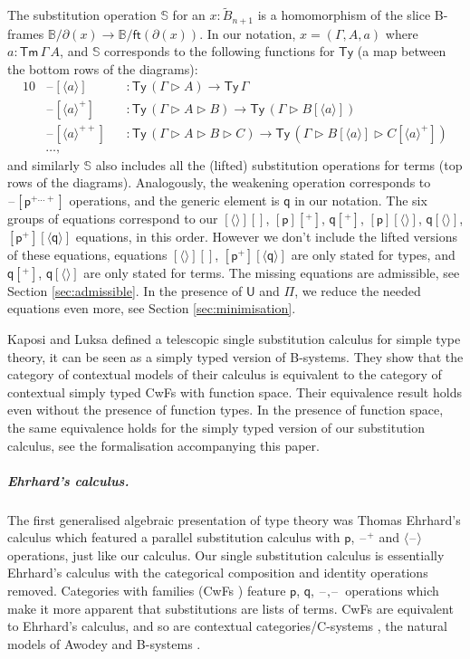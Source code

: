 \documentclass[a4paper,UKenglish,cleveref, autoref, thm-restate]{lipics-v2021}
\newcommand{\ra}{\rightarrow}
\newcommand{\Ty}{\mathsf{Ty}}
\newcommand{\Tm}{\mathsf{Tm}}
\newcommand{\p}{\mathsf{p}}
\newcommand{\q}{\mathsf{q}}
\newcommand{\ext}{\mathop{\triangleright}}
\newcommand{\U}{\mathsf{U}}
\newcommand{\blank}{\mathord{\hspace{1pt}\text{--}\hspace{1pt}}} %
\begin{document}
The substitution operation $\mathbb{S}$ for an $x:\tilde{B}_{n+1}$ is
a homomorphism of the slice B-frames $\mathbb{B}/\partial(x) \ra
\mathbb{B}/\mathsf{ft}(\partial(x))$. In our notation, $x = (\Gamma,
A, a)$ where $a : \Tm\,\Gamma\,A$, and $\mathbb{S}$ corresponds to the
following functions for $\Ty$ (a map between the bottom rows of the
diagrams):
\begin{alignat*}{10}
  & \blank[\langle a\rangle] && : \Ty\,(\Gamma\ext A)\ra\Ty\,\Gamma \\
  & \blank[\langle a\rangle^+] && : \Ty\,(\Gamma\ext A\ext B)\ra\Ty\,(\Gamma\ext B[\langle a\rangle]) \\
  & \blank[\langle a\rangle^{++}] && : \Ty\,(\Gamma\ext A\ext B\ext C)\ra\Ty\,(\Gamma\ext B[\langle a\rangle]\ext C[\langle a\rangle^+]) \\
  & \dots,
\end{alignat*}
and similarly $\mathbb{S}$ also includes all the (lifted) substitution
operations for terms (top rows of the
diagrams). Analogously, the weakening operation corresponds to
$\blank[\p^{+\dots+}]$ operations, and the generic element is $\q$ in
our notation. The six groups of equations correspond to our
$[\langle\rangle][]$, $[\p][^+]$, $\q[^+]$, $[\p][\langle\rangle]$,
$\q[\langle\rangle]$, $[\p^+][\langle\q\rangle]$ equations, in this
order. However we don't include the lifted versions of these equations,
equations $[\langle\rangle][]$, $[\p^+][\langle\q\rangle]$ are only
stated for types, and $\q[^+]$, $\q[\langle\rangle]$ are only stated
for terms. The missing equations are admissible, see Section
\ref{sec:admissible}. In the presence of $\U$ and $\Pi$, we
reduce the needed equations even more, see Section
\ref{sec:minimisation}.

Kaposi and Luksa \cite{luksa} defined a telescopic single substitution
calculus for simple type theory, it can be seen as a simply typed
version of B-systems. They show that the category of contextual models
of their calculus is equivalent to the category of contextual simply
typed CwFs with function space. Their equivalence result holds even
without the presence of function types. In the presence of function
space, the same equivalence holds for the simply typed version of our
substitution calculus, see the formalisation accompanying this paper.

\subparagraph*{Ehrhard's calculus.}
The first generalised algebraic presentation of type theory was Thomas
Ehrhard's calculus \cite{ehrhard,coquandEhrhard} which featured a
parallel substitution calculus with $\p$, $\blank^+$ and
$\langle\blank\rangle$ operations, just like our calculus. Our
single substitution calculus is essentially Ehrhard's calculus with
the categorical composition and identity operations
removed. Categories with families (CwFs
\cite{DBLP:conf/types/Dybjer95,Castellan2021}) feature $\p$, $\q$,
$\blank,\blank$ operations which make it more apparent that
substitutions are lists of terms. CwFs are equivalent to Ehrhard's
calculus, and so are contextual categories/C-systems
\cite{DBLP:journals/apal/Cartmell86,DBLP:journals/lmcs/AhrensLV18},
the natural models of Awodey \cite{DBLP:journals/mscs/Awodey18} and
B-systems \cite{AHRENS_EMMENEGGER_NORTH_RIJKE_2023}.
\end{document}
